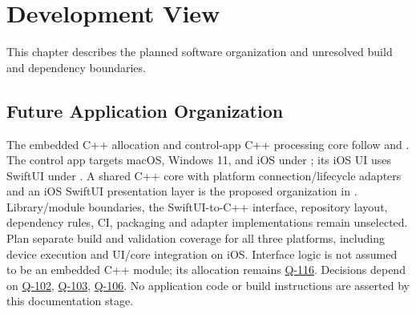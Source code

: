 \chapter{Development View}
\label{Section:DevelopmentViewResponsibility}
This chapter describes the planned software organization and unresolved build and dependency boundaries.



\section{Future Application Organization}
The embedded C++ allocation and control-app C++ processing core follow  and . The control app targets macOS, Windows 11, and iOS under ; its iOS UI uses SwiftUI under . A shared C++ core with platform connection/lifecycle adapters and an iOS SwiftUI presentation layer is the proposed organization in . Library/module boundaries, the SwiftUI-to-C++ interface, repository layout, dependency rules, CI, packaging and adapter implementations remain unselected. Plan separate build and validation coverage for all three platforms, including device execution and UI/core integration on iOS. Interface logic is not assumed to be an embedded C++ module; its allocation remains \hyperref[Question:Q-116]{Q-116}. Decisions depend on \hyperref[Question:Q-102]{Q-102}, \hyperref[Question:Q-103]{Q-103}, \hyperref[Question:Q-106]{Q-106}. No application code or build instructions are asserted by this documentation stage.
